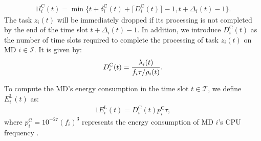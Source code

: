 \documentclass[10pt, journal,letterpaper]{IEEEtran}
\begin{document}
\begin{alignat}{1}
	l_i^{\text{C}}(t) = \min \Big\{t + \delta_i^{\text{C}}(t) + \lceil D_i^{\text{C}}(t) \rceil - 1, t + \Delta_i(t) - 1\Big\}.
	\label{6}  
\end{alignat}
The task $z_i(t)$ will be immediately dropped if its processing is not completed by the end of the time slot $t + \Delta_i(t) - 1$. In addition, we introduce $D_i^{\text{C}}(t)$ as the number of time slots required to complete the processing of task $z_i(t)$ on MD $i \in \mathcal{I}$. It is given by:
\begin{alignat}{1}
	D_i^{\text{C}}(t) = { \lambda_i(t)  \over  f_i  \tau /  \rho_i(t)}.
	\label{7}  
\end{alignat}



To compute the MD's energy consumption in the time slot $t \in \mathcal{T}$, we define $E_i^{\text{L}}(t)$ as:
\begin{alignat}{1}
	E_i^{\text{L}}(t) =  D_i^{\text{C}}(t) p_i^{\text{C}}  \tau, %
	\label{8}  
\end{alignat}
where $p_i^{\text{C}} = 10^{-27}(f_i)^3$ represents the energy consumption of MD $i$'s CPU frequency \cite{mao2016dynamic}.
\end{document}
